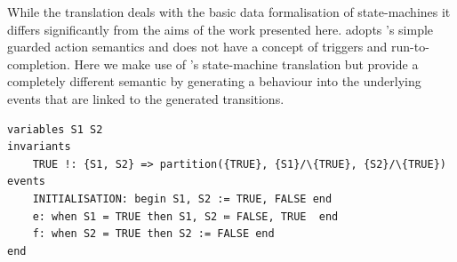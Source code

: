 While the \UMLB translation deals with the basic data formalisation of state-machines it differs significantly from the aims of the work presented here. 
\UMLB adopts \EventB's simple guarded action semantics and does not have a concept of triggers and run-to-completion.
Here we make use of \UMLB's state-machine translation but provide a completely different semantic by generating a behaviour into the underlying \EventB events that are linked to the generated \UMLB transitions.
\begin{lstlisting}[caption={Translation of the state-machine in Fig.~\ref{fig:iumlb-sm}},label={lst:eventb-sm}, language=Event-B, escapechar=|, frame=single]
 variables S1 S2
invariants 
	TRUE !: {S1, S2} => partition({TRUE}, {S1}/\{TRUE}, {S2}/\{TRUE})
events
    INITIALISATION: begin S1, S2 := TRUE, FALSE end
    e: when S1 = TRUE then S1, S2 ≔ FALSE, TRUE  end
    f: when S2 = TRUE then S2 := FALSE end
end
\end{lstlisting}
